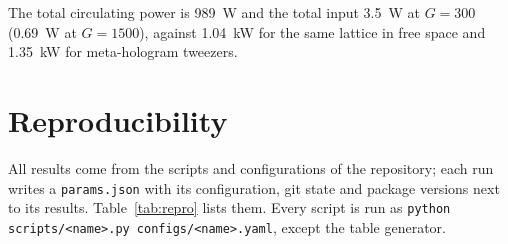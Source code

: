 \documentclass[11pt]{article}
\begin{document}
The total circulating power is \SI{989}{\watt} and the total input \SI{3.5}{\watt} at $G = 300$
(\SI{0.69}{\watt} at $G = 1500$), against \SI{1.04}{\kilo\watt} for the same lattice in free space and
\SI{1.35}{\kilo\watt} for meta-hologram tweezers.

\section{Reproducibility}
\label{app:repro}

All results come from the scripts and configurations of the repository; each run writes a
\texttt{params.json} with its configuration, git state and package versions next to its results.
Table~\ref{tab:repro} lists them. Every script is run as
\texttt{python scripts/<name>.py configs/<name>.yaml}, except the table generator.
\end{document}

